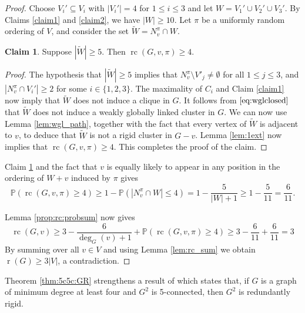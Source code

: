 \documentclass[11pt,a4paper]{article}
\theoremstyle{definition}
\newtheorem{claim}[theorem]{Claim}
\DeclareMathOperator{\rr}{r}
\DeclareMathOperator{\rc}{rc}
\newcommand{\Prob}{\mathbb{P}}
\begin{document}
\begin{proof}
    Choose $V_i'\subseteq V_i$ with $|V_i'|=4$ for $1\leq i\leq 3$ and
    let $W=V_1'\cup V_2'\cup V_3'$.
    By Claims \ref{claim1} and \ref{claim2}, we have $|W|\geq 10$. Let $\pi$ be a uniformly random ordering of $V$,
    and consider the set $\tilde W = N_v^{\pi}\cap W$.
    
    \begin{claim}
        \label{claim3}
        Suppose $|\tilde W|\geq 5$. Then $\rc(G,v,\pi)\geq 4$. 
    \end{claim} 
    
    
    \begin{proof} The hypothesis that $|\tilde W|\geq 5$ implies that $N_v^{\pi} \setminus V'_j \not= \emptyset$ for all $1\leq j\leq 3$, and 
         $|N_v^{\pi}\cap V_i'|\geq 2$
        for some $i\in \{1,2,3\}$. 
        The maximality of
        $C_i$ and Claim \ref{claim1} now imply that
        $\tilde W$ does not induce a clique in $G$. 
        It follows from $\eqref{eq:wglclosed}$ that $\tilde W$ does not induce a 
        weakly globally linked cluster in $G$.
        We can now use  Lemma \ref{lem:wgl_path}, together with the fact that every vertex of  $\tilde W$ is adjacent to $v$, to deduce that $\tilde W$ is not a rigid cluster in $G-v$.
        Lemma \ref{lem:1ext} now implies that
        $\rc(G,v,\pi)\geq 4$. This completes the proof of the claim.
    \end{proof}
    
    Claim \ref{claim3} and the fact that $v$ is equally likely to appear in any position in the ordering of $W+v$ induced by $\pi$ gives
    \begin{equation*}
        \Prob(\rc(G,v,\pi)\geq 4)\geq 1-\Prob(|N_v^{\pi}\cap W|\leq 4) = 1-\frac{5}{|W|+1}\geq 1-\frac{5}{11}= \frac{6}{11}.
    \end{equation*}
    
    \noindent
    Lemma \ref{prop:rc:probsum} now gives
    \begin{equation*}
        \rc(G,v) \geq 3-\frac{6}{\deg_G(v)+1} + \Prob(\rc(G,v,\pi)\geq 4) \geq
        3-\frac{6}{11}+ \frac{6}{11} = 3
    \end{equation*}
        By summing over all $v\in V$ and using 
    Lemma \ref{lem:rc_sum}
    we obtain
    $\rr(G)\geq 3|V|$, a contradiction.
\end{proof}

Theorem \ref{thm:5c5c:GR} strengthens a result of \cite{Jsquare} which states that, if $G$ is a graph of minimum degree at least four and
$G^2$ is 5-connected, then $G^2$ is redundantly rigid.
			
\end{document}
